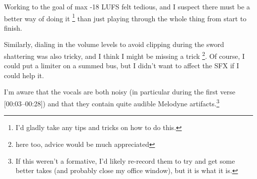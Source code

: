 

Working to the goal of max -18 LUFS felt tedious, and I suspect there must be a better way of doing it \footnote{I'd gladly take any tips and tricks on how to do this.} than just playing through the whole thing from start to finish.

Similarly, dialing in the volume levels to avoid clipping during the sword shattering was also tricky, and I think I might be missing a trick \footnote{here too, advice would be much appreciated}. Of course, I could put a limiter on a summed bus, but I didn't want to affect the SFX if I could help it.

I'm aware that the vocals are both noisy (in particular during the first verse [00:03--00:28]) and that they contain quite audible Melodyne artifacts.\footnote{If this weren't a formative, I'd likely re-record them to try and get some better takes (and probably close my office window), but it is what it is.}
